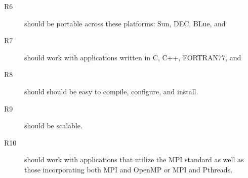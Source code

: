 \begin{description}

\item[R6] \hypre{} should be portable across these platforms: Sun, DEC,
BLue, and
	
\item[R7] \hypre{} should work with applications written in C, C++,
FORTRAN77, and
	
\item[R8] \hypre{} should should be easy to compile, configure, and
install.

\item[R9] \hypre{} should be scalable.

\item[R10] \hypre{} should work with applications that utilize the MPI
standard as well as those incorporating both MPI and OpenMP or MPI and
Pthreads.

\end{description}

